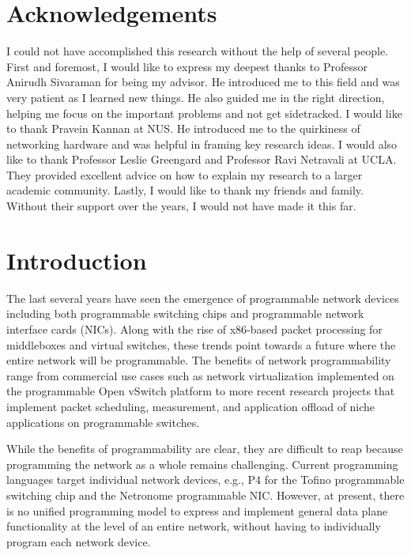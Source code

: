 \documentclass[12pt, oneside]{article}
\begin{document}
\newpage
\section*{Acknowledgements}
I could not have accomplished this research without the help of several people. First and foremost, I would like to express my deepest thanks to Professor Anirudh Sivaraman for being my advisor. He introduced me to this field and was very patient as I learned new things. He also guided me in the right direction, helping me focus on the important problems and not get sidetracked. I would like to thank Pravein Kannan at NUS. He introduced me to the quirkiness of networking hardware and was helpful in framing key research ideas. I would also like to thank Professor Leslie Greengard and Professor Ravi Netravali at UCLA. They provided excellent advice on how to explain my research to a larger academic community.  Lastly, I would like to thank my friends and family. Without their support over the years, I would not have made it this far. 


\newpage
\tableofcontents

\newpage
\listoffigures

\newpage
\lstlistoflistings

\newpage
\section{Introduction}
The last several years have seen the emergence of programmable network devices
including both programmable switching chips and programmable network interface
cards (NICs). Along with the rise of x86-based packet processing for
middleboxes and virtual switches, these trends point towards a future where the
entire network will be programmable. The benefits of network programmability
range from commercial use cases such as network virtualization implemented on
the programmable Open vSwitch platform to more recent research projects that
implement packet scheduling, measurement, and application offload of niche
applications on programmable switches.

While the benefits of programmability are clear, they are difficult to reap
because programming the network as a whole remains challenging. Current
programming languages target individual network devices, e.g., P4 for the
Tofino programmable switching chip and the Netronome programmable NIC. However,
at present, there is no unified programming model to express and implement
general data plane functionality at the level of an entire network, without
having to individually program each network device.
\end{document}
